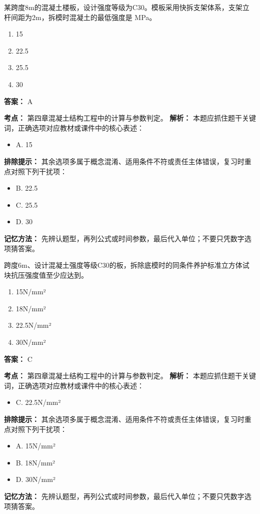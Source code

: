 \documentclass[UTF8,fontset=fandol,11pt]{ctexart}
\begin{document}
\begin{quizbox}[title={第 37 题}]
某跨度8m的混凝土楼板，设计强度等级为C30。模板采用快拆支架体系，支架立杆间距为2m，拆模时混凝土的最低强度是 MPa。\\
\begin{enumerate}[label=\Alph*.]
\item 15
\item 22.5
\item 25.5
\item 30
\end{enumerate}
\textbf{答案：} A
\vspace{0.25em}
\begin{answerbox}[title={考点解析}]
\textbf{考点：} 第四章混凝土结构工程中的计算与参数判定。
\textbf{解析：} 本题应抓住题干关键词，正确选项对应教材或课件中的核心表述：
\begin{itemize}
\item A. 15
\end{itemize}
\textbf{排除提示：} 其余选项多属于概念混淆、适用条件不符或责任主体错误，复习时重点对照下列干扰项：
\begin{itemize}
\item B. 22.5
\item C. 25.5
\item D. 30
\end{itemize}
\textbf{记忆方法：} 先辨认题型，再列公式或时间参数，最后代入单位；不要只凭数字选项猜答案。
\end{answerbox}
\end{quizbox}

\vspace{0.2em}

\begin{quizbox}[title={第 38 题}]
跨度6m、设计混凝土强度等级C30的板，拆除底模时的同条件养护标准立方体试块抗压强度值至少应达到。\\
\begin{enumerate}[label=\Alph*.]
\item 15N/mm²
\item 18N/mm²
\item 22.5N/mm²
\item 30N/mm²
\end{enumerate}
\textbf{答案：} C
\vspace{0.25em}
\begin{answerbox}[title={考点解析}]
\textbf{考点：} 第四章混凝土结构工程中的计算与参数判定。
\textbf{解析：} 本题应抓住题干关键词，正确选项对应教材或课件中的核心表述：
\begin{itemize}
\item C. 22.5N/mm²
\end{itemize}
\textbf{排除提示：} 其余选项多属于概念混淆、适用条件不符或责任主体错误，复习时重点对照下列干扰项：
\begin{itemize}
\item A. 15N/mm²
\item B. 18N/mm²
\item D. 30N/mm²
\end{itemize}
\textbf{记忆方法：} 先辨认题型，再列公式或时间参数，最后代入单位；不要只凭数字选项猜答案。
\end{answerbox}
\end{quizbox}
\end{document}
